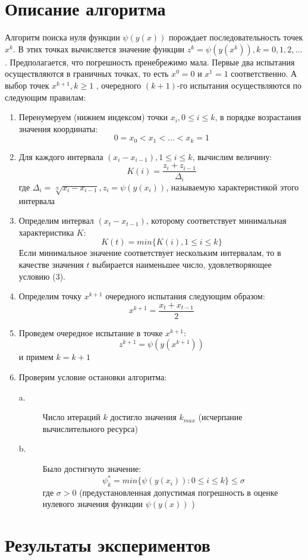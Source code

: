 \documentclass[11pt, oneside, a4paper]{article}
\begin{document}
\section{Описание алгоритма}
Алгоритм поиска нуля функции $\psi(y(x))$ порождает последовательность точек ${x^{k}}$. В этих точках вычисляется значение функции $z^{k}=\psi(y(x^{k})), k= 0, 1, 2,...$ . Предполагается, что погрешность пренебрежимо мала. Первые два испытания осуществляются в граничных точках, то есть $x^{0}=0$ и $x^{1}=1$ соответственно. А выбор точек $x^{k+1}, k\geq 1$ , очередного $(k+1)$-го испытания осуществляются по следующим правилам:
\begin{enumerate}
	\item Перенумеруем (нижнем индексом) точки $x_{i} , 0\leq i\leq k$, в порядке возрастания значения координаты:\[0=x_{0}<x_{1}<...<x_{k}=1 \tag{3}\] 
  \item Для каждого интервала $(x_{i}-x_{i-1}), 1\leq i\leq k$, вычислим величину:\[K(i)=\frac{z_{i}+z_{i-1}}{\Delta_{i}} \tag{4}\] где $\Delta_{i}=\sqrt[N]{x_{i}-x_{i-1}},z_{i}=\psi(y(x_{i}))$, называемую характеристикой этого интервала
	\item Определим интервал $(x_{t}-x_{t-1})$, которому соответствует минимальная характеристика $K$:\[K(t)=min\{K(i),1\leq i\leq k\} \tag{5}\]Если минимальное значение соответствует нескольким интервалам, то в качестве значения $t$ выбирается наименьшее число, удовлетворяющее условию (3).
	\item Определим точку $x^{k+1}$ очередного испытания следующим образом:\[x^{k+1}=\frac{x_{t}+x_{t-1}}{2}\tag{6}\]
	\item Проведем очередное испытание в точке $x^{k+1}$:\[z^{k+1}=\psi(y(x^{k+1}))\tag{7}\] и примем $k= k+1$
	\item Проверим условие остановки алгоритма:
	\begin{description}
		\item[a.] Число итераций $k$ достигло значения $k_{max}$ (исчерпание вычислительного ресурса)
		\item[b.] Было достигнуто значение:\[\psi^{*}_{k}=min\{\psi(y(x_{i})):0\leq i\leq k\}\leq \sigma \tag{8}\]где $\sigma>0$ (предустановленная допустимая погрешность в оценке нулевого значения функции $\psi(y(x))$ )
	\end{description}
\end{enumerate}

\section{Результаты экспериментов}
\end{document}

